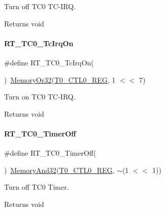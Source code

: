 Turn off T\+C0 T\+C-\/\+I\+RQ. 

\begin{DoxyReturn}{Returns}
void 
\end{DoxyReturn}
\mbox{\label{a00137_a1ff15e860147b3fff582b7603ba7ffa8}} 
\paragraph{\texorpdfstring{R\+T\+\_\+\+T\+C0\+\_\+\+Tc\+Irq\+On}{RT\_TC0\_TcIrqOn}}
{\footnotesize\ttfamily \#define R\+T\+\_\+\+T\+C0\+\_\+\+Tc\+Irq\+On(\begin{DoxyParamCaption}{ }\end{DoxyParamCaption})~\mbox{\hyperlink{a00068_a27874a97deab7cecdde5ddecf466e31e}{Memory\+Or32}}(\mbox{\hyperlink{a00068_ac94b0659ef32086a6752672082c0b3ed}{T0\+\_\+\+C\+T\+L0\+\_\+\+R\+EG}}, 1 $<$$<$ 7)}



Turn on T\+C0 T\+C-\/\+I\+RQ. 

\begin{DoxyReturn}{Returns}
void 
\end{DoxyReturn}
\mbox{\label{a00137_acbfad29faf802168f3281e5754e40aa9}} 
\paragraph{\texorpdfstring{R\+T\+\_\+\+T\+C0\+\_\+\+Timer\+Off}{RT\_TC0\_TimerOff}}
{\footnotesize\ttfamily \#define R\+T\+\_\+\+T\+C0\+\_\+\+Timer\+Off(\begin{DoxyParamCaption}{ }\end{DoxyParamCaption})~\mbox{\hyperlink{a00068_ad87cedffcaadc51db22594fce55173d4}{Memory\+And32}}(\mbox{\hyperlink{a00068_ac94b0659ef32086a6752672082c0b3ed}{T0\+\_\+\+C\+T\+L0\+\_\+\+R\+EG}}, $\sim$(1 $<$$<$ 1))}



Turn off T\+C0 Timer. 

\begin{DoxyReturn}{Returns}
void 
\end{DoxyReturn}
\mbox{\label{a00137_aa7936fffa8b7bcd47751d2e89f81d4a9}} 
